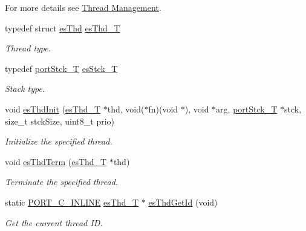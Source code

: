 For more details see \hyperlink{threads}{Thread Management}. \begin{DoxyCompactItemize}
\item 
typedef struct \hyperlink{structesThd}{es\-Thd} \hyperlink{group__kern__intf_ga62e3a3ca0a4597a19c43cb8868810d82}{es\-Thd\-\_\-\-T}
\begin{DoxyCompactList}\small\item\em Thread type. \end{DoxyCompactList}\item 
typedef \hyperlink{group__template__cpu__intf_ga13cc91970e3e05fe4210440c068d3f4a}{port\-Stck\-\_\-\-T} \hyperlink{group__kern__intf_ga24160ddd0cb0327108cc652bfe6a49e5}{es\-Stck\-\_\-\-T}
\begin{DoxyCompactList}\small\item\em Stack type. \end{DoxyCompactList}\item 
void \hyperlink{group__kern__intf_gac91734f3ee867b519f59bf81cc7fde88}{es\-Thd\-Init} (\hyperlink{group__kern__intf_ga62e3a3ca0a4597a19c43cb8868810d82}{es\-Thd\-\_\-\-T} $\ast$thd, void($\ast$fn)(void $\ast$), void $\ast$arg, \hyperlink{group__template__cpu__intf_ga13cc91970e3e05fe4210440c068d3f4a}{port\-Stck\-\_\-\-T} $\ast$stck, size\-\_\-t stck\-Size, uint8\-\_\-t prio)
\begin{DoxyCompactList}\small\item\em Initialize the specified thread. \end{DoxyCompactList}\item 
void \hyperlink{group__kern__intf_gac9d1eac76f26096614e8196bcfd8b905}{es\-Thd\-Term} (\hyperlink{group__kern__intf_ga62e3a3ca0a4597a19c43cb8868810d82}{es\-Thd\-\_\-\-T} $\ast$thd)
\begin{DoxyCompactList}\small\item\em Terminate the specified thread. \end{DoxyCompactList}\item 
static \hyperlink{group__template__compiler_ga87952d6e574c7f437503926e833ba345}{P\-O\-R\-T\-\_\-\-C\-\_\-\-I\-N\-L\-I\-N\-E} \hyperlink{group__kern__intf_ga62e3a3ca0a4597a19c43cb8868810d82}{es\-Thd\-\_\-\-T} $\ast$ \hyperlink{group__kern__intf_gae2a2c5fe0128d446a64512b0714bfb6d}{es\-Thd\-Get\-Id} (void)
\begin{DoxyCompactList}\small\item\em Get the current thread I\-D. \end{DoxyCompactList}\item 

\end{DoxyCompactItemize}
